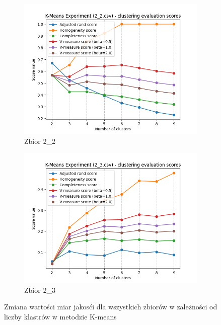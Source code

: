 \documentclass[12pt]{article}
\begin{document}
\begin{figure}[H]
\begin{subfigure}[b]{0.3\textwidth}
        \includegraphics[width=\linewidth]{img/exp_2/kmeans/2_2_scores.png}
        \caption{Zbior 2\_2}
    \end{subfigure}
    \hfill
    \begin{subfigure}[b]{0.3\textwidth}
        \includegraphics[width=\linewidth]{img/exp_2/kmeans/2_3_scores.png}
        \caption{Zbior 2\_3}
    \end{subfigure}
    \caption{\centering Zmiana wartości miar jakosći dla wszystkich zbiorów w zależności od liczby klastrów w metodzie K-means}
\end{figure}
\end{document}
